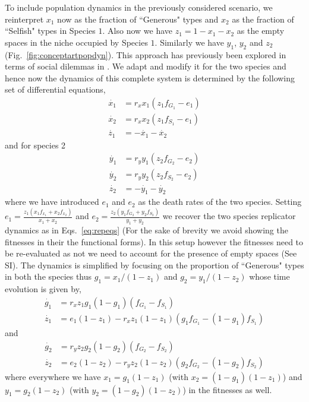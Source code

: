 \documentclass[12pt]{article}
\begin{document}
To include population dynamics in the previously considered scenario, we reinterpret $x_1$ now as the fraction of ``Generous" types and $x_2
$ as the fraction of ``Selfish" types in Species $1$.
Also now we have $z_1 = 1 - x_1 - x_2$ as the empty spaces in the niche occupied by Species $1$. Similarly we have $y_1$, $y_2$ and $z_2$ (Fig.~\ref{fig:conceptartpopdyn}).
This approach has previously been explored in terms of social dilemmas in \citep{hauert:PRSB:2006}.
We adapt and modify it for the two species and hence now the dynamics of this complete system is determined by the following set of differential equations,
%
\begin{align}
	\dot{x_1} &= r_x x_1 (z_1 f_{G_1} - e_1) \nonumber \\
	\dot{x_2} &= r_x x_2 (z_1 f_{S_1} - e_1) \\
	\dot{z_1} &= - \dot{x_1} - \dot{x_2} \nonumber
\end{align}
%
and for species 2
\begin{align}
	\dot{y_1} &= r_y y_1 (z_2 f_{G_2} - e_2) \nonumber \\
	\dot{y_2} &= r_y y_2 (z_2 f_{S_2} - e_2) \\
	\dot{z_2} &= - \dot{y_1} - \dot{y_2} \nonumber
\end{align}
%
where we have introduced $e_1$ and $e_2$ as the death rates of the two species.
Setting $e_1 = \frac{z_1 (x_1 f_{x_1} + x_2 f_{x_2}) }{x_1 + x_2}$ and $e_2 = \frac{z_2 (y_1 f_{G_2} + y_2 f_{S_2}) }{y_1 + y_2}$ we recover the two species replicator dynamics as in Eqs.~\ref{eq:repeqs} (For the sake of brevity we avoid showing the fitnesses in their the functional forms).
In this setup however the fitnesses need to be re-evaluated as not we need to account for the presence of empty spaces (See SI).
The dynamics is simplified by focusing on the proportion of ``Generous" types in both the species thus $g_1 = x_1/(1-z_1)$ and $g_2 = y_1/(1-z_2)$ whose time evolution is given by,
\begin{align}
	\dot{g_1} &= r_x z_1 g_1 (1-g_1) (f_{G_1} - f_{S_1}) \nonumber \\
	\dot{z_1} &= e_1 (1-z_1) - r_x z_1 (1-z_1) (g_1 f_{G_1} -  (1-g_1) f_{S_1})
\end{align}
and
\begin{align}
	\dot{g_2} &= r_y z_2 g_2 (1-g_2) (f_{G_2} - f_{S_2}) \nonumber \\
	\dot{z_2} &= e_2 (1-z_2) - r_y z_2 (1-z_2) (g_2 f_{G_2} -  (1-g_2) f_{S_2})
\end{align}
%
where everywhere we have $x_1 = g_1 (1-z_1)$ (with $x_2 = (1-g_1) (1-z_1)$) and $y_1 = g_2 (1-z_2)$ (with $y_2 = (1-g_2) (1-z_2)$) in the fitnesses as well.
\end{document}
